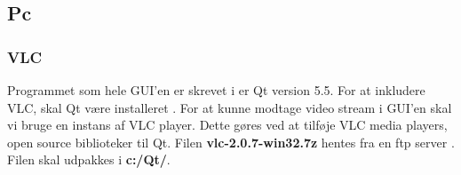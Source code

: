 \subsection{Pc}
\subsubsection{VLC}
Programmet som hele GUI'en er skrevet i er Qt version 5.5. For at inkludere VLC, skal Qt være installeret \cite{lib:qt}. For at kunne modtage video stream i GUI'en skal vi bruge en instans af VLC player. Dette gøres ved at tilføje VLC media players, open source biblioteker til Qt. Filen \textbf{vlc-2.0.7-win32.7z} hentes fra en ftp server \cite{lib:vlc-ftp}. Filen skal udpakkes i \textbf{c:/Qt/}. 